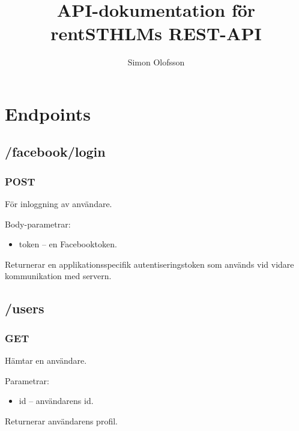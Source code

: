 \documentclass{article}
\title{API-dokumentation för rentSTHLMs REST-API}
\author{Simon Olofsson}
\date{}
\begin{document}

\maketitle

\newpage

\tableofcontents

\newpage

\section {Endpoints}
\label{sec:Endpoints}

\subsection{/facebook/login}
\label{sub:_facebook_login}

\subsubsection {POST}
\label{ssub:POST}

För inloggning av användare.

Body-parametrar:

\begin{itemize}
    \item token -- en Facebooktoken.
\end{itemize}

Returnerar en applikationsspecifik autentiseringstoken som används vid vidare kommunikation med servern.

\subsection{/users}
\label{sub:_user}

\subsubsection{GET}
\label{ssub:GET}

Hämtar en användare.

Parametrar:

\begin{itemize}
    \item id -- användarens id.
\end{itemize}

Returnerar användarens profil.
\end{document}

